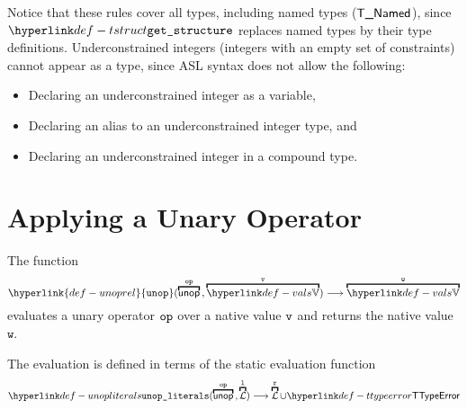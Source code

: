 \documentclass{book}
\newcommand\unoprel[0]{\hyperlink{def-unoprel}{\texttt{unop}}}
\newcommand\vl[0]{\texttt{l}}
\newcommand\vw[0]{\texttt{w}}
\begin{document}
\begin{emptyformal}
Notice that these rules cover all types, including named types ($\textsf{T\_Named}$),
since $\tstruct$ replaces named types by their type definitions.
%
Underconstrained integers (integers with an empty set of constraints)
cannot appear as a type, since ASL syntax does not allow the following:
\begin{itemize}
\item Declaring an underconstrained integer as a variable,
\item Declaring an alias to an underconstrained integer type, and
\item Declaring an underconstrained integer in a compound type.
\end{itemize}
\end{emptyformal}

\section{Applying a Unary Operator \label{sec:UnaryOperator}}
\hypertarget{def-unoprel}{}
The function
\[
  \unoprel(\overname{\unop}{\op} \aslsep \overname{\vals}{\vv}) \aslto \overname{\vals}{\vw}
\]
evaluates a unary operator $\texttt{op}$ over a native value $\texttt{v}$ and returns the native value $\vw$.

The evaluation is defined in terms of the static evaluation function
\hypertarget{def-unopliterals}{}
\[
  \unopliterals(\overname{\unop}{\op} \aslsep \overname{\literals}{\vl}) \aslto
  \overname{\literals}{\vr} \cup \TTypeError
\]
\end{document}

